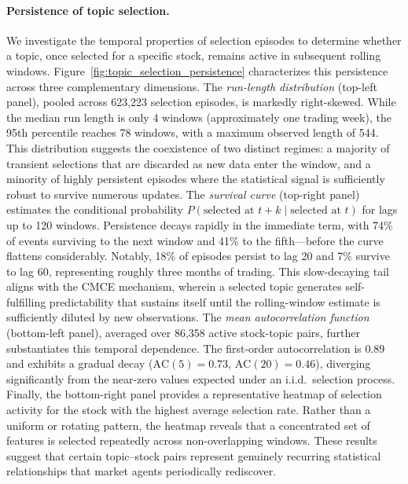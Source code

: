 \paragraph{Persistence of topic selection.}

We investigate the temporal properties of selection episodes to determine whether a topic, once selected for a specific stock, remains active in subsequent rolling windows.
Figure~\ref{fig:topic_selection_persistence} characterizes this persistence across three complementary dimensions.
The \emph{run-length distribution} (top-left panel), pooled across 623,223 selection episodes, is markedly right-skewed.
While the median run length is only 4 windows (approximately one trading week), the 95th percentile reaches 78 windows, with a maximum observed length of 544.
This distribution suggests the coexistence of two distinct regimes: a majority of transient selections that are discarded as new data enter the window, and a minority of highly persistent episodes where the statistical signal is sufficiently robust to survive numerous updates.
The \emph{survival curve} (top-right panel) estimates the conditional probability $P(\text{selected at } t+k \mid \text{selected at } t)$ for lags up to 120 windows.
Persistence decays rapidly in the immediate term, with 74\% of events surviving to the next window and 41\% to the fifth—before the curve flattens considerably.
Notably, 18\% of episodes persist to lag 20 and 7\% survive to lag 60, representing roughly three months of trading.
This slow-decaying tail aligns with the CMCE mechanism, wherein a selected topic generates self-fulfilling predictability that sustains itself until the rolling-window estimate is sufficiently diluted by new observations.
The \emph{mean autocorrelation function} (bottom-left panel), averaged over 86,358 active stock-topic pairs, further substantiates this temporal dependence.
The first-order autocorrelation is 0.89 and exhibits a gradual decay ($\text{AC}(5) = 0.73$, $\text{AC}(20) = 0.46$), diverging significantly from the near-zero values expected under an i.i.d.\ selection process.
Finally, the bottom-right panel provides a representative heatmap of selection activity for the stock with the highest average selection rate.
Rather than a uniform or rotating pattern, the heatmap reveals that a concentrated set of features is selected repeatedly across non-overlapping windows.
These results suggest that certain topic--stock pairs represent genuinely recurring statistical relationships that market agents periodically rediscover.

